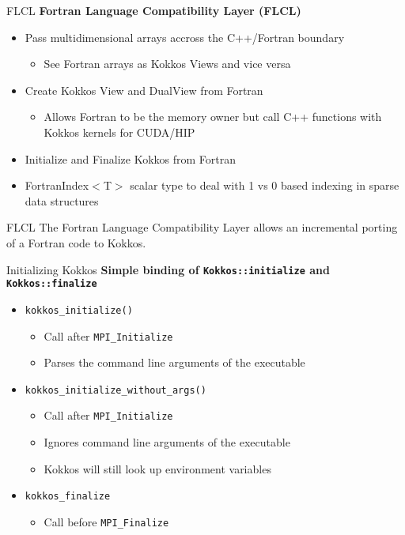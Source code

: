 \begin{frame}[fragile]{FLCL}
\textbf{Fortran Language Compatibility Layer (FLCL)}

\begin{itemize}
  \item Pass multidimensional arrays accross the C++/Fortran boundary
  \begin{itemize}
    \item See Fortran arrays as Kokkos Views and vice versa
  \end{itemize}
  \item Create Kokkos View and DualView from Fortran
  \begin{itemize}
     \item Allows Fortran to be the memory owner but call C++ functions with Kokkos kernels for CUDA/HIP
  \end{itemize}
  \item Initialize and Finalize Kokkos from Fortran
  \item FortranIndex$<$T$>$ scalar type to deal with 1 vs 0 based indexing in sparse data structures
\end{itemize}

\pause
\begin{block}{FLCL}
  The Fortran Language Compatibility Layer allows an incremental porting of a Fortran code to Kokkos.
\end{block}
\end{frame}

\begin{frame}[fragile]{Initializing Kokkos}
\textbf{Simple binding of \texttt{Kokkos::initialize} and \texttt{Kokkos::finalize}}

\vspace{5pt}
\begin{itemize}
  \item \texttt{kokkos\_initialize()}
  \begin{itemize}
    \item Call after \texttt{MPI\_Initialize}
    \item Parses the command line arguments of the executable
  \end{itemize}
  \item \texttt{kokkos\_initialize\_without\_args()}
  \begin{itemize}
    \item Call after \texttt{MPI\_Initialize}
    \item Ignores command line arguments of the executable
    \item Kokkos will still look up environment variables
  \end{itemize}
  \item \texttt{kokkos\_finalize}
  \begin{itemize}
    \item Call before \texttt{MPI\_Finalize}
  \end{itemize}
\end{itemize}
\end{frame}


